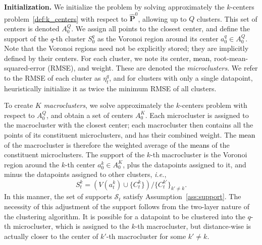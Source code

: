 \documentclass[12pt]{article}
\renewcommand{\paragraph}[1]{\textbf{#1.}\;}
\newcommand{\ie}{{\it i.e.}}
\newcommand{\prob}{{\mathbf P}}
\newcommand{\RC}[1]{\textcolor{black}{#1}}
\newcommand{\RC}[1]{\textcolor{blue}{#1}}
\begin{document}


\paragraph{Initialization}
We initialize the problem by solving approximately the $k$-centers problem~\eqref{def:k_centers} with respect to $\hat{\prob}^0$, allowing up to $Q$ clusters. This set of centers is denoted $A^Q_0$. We assign all points to the closest center, and define the support of the $q$-th cluster $S^q_0$ as the Voronoi region around its center $a_0^q \in A^Q_0$. Note that the Voronoi regions need not be explicitly stored; they are implicitly defined by their centers. 
For each cluster, we note its center, \RC{mean}, root-mean-squared-error (RMSE), and weight. These are denoted the {\it microclusters}. We refer to the RMSE of each cluster as $\eta^q_t$, and for clusters with only a single datapoint, heuristically initialize it as twice the minimum RMSE of all clusters. 

To create $K$ {\it macroclusters}, we solve approximately the $k$-centers problem with respect to $A^Q_0$, and obtain a set of centers $A^K_0$. Each microcluster is assigned to the macrocluster with the closest center; each macrocluster then contains all the points of its constituent microclusters, and has their combined weight. The \RC{mean} of the macrocluster is therefore the weighted average of the \RC{means} of the constituent microclusters. The support of the $k$-th macrocluster is the Voronoi region around the $k$-th center $a_0^k \in A^K_0$, plus the datapoints assigned to it, and minus the datapoints assigned to other clusters, \ie,
\begin{equation}
\label{eq:update_sup}
    S^k_t = (V(a_t^k) \cup \{C^k_t\})/\{C^{k'}_t\}_{k' \neq k}.
\end{equation}
In this manner, the set of supports $\mathcal{S}_t$ satisfy Assumption~\ref{ass:support}. The necessity of this adjustment of the support follows from the two-layer nature of the clustering algorithm. It is possible for a datapoint to be clustered into the $q$-th microcluster, which is assigned to the $k$-th macrocluster, but distance-wise is actually closer to the center of $k'$-th macrocluster for some $k' \neq k$.
\end{document}
